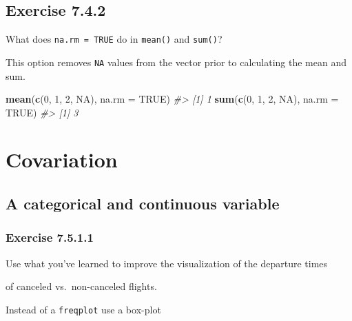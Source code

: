 \documentclass[]{book}
\newenvironment{Shaded}{\begin{snugshade}}{\end{snugshade}}
\newcommand{\CommentTok}[1]{\textcolor[rgb]{0.56,0.35,0.01}{\textit{#1}}}
\newcommand{\DataTypeTok}[1]{\textcolor[rgb]{0.13,0.29,0.53}{#1}}
\newcommand{\DecValTok}[1]{\textcolor[rgb]{0.00,0.00,0.81}{#1}}
\newcommand{\KeywordTok}[1]{\textcolor[rgb]{0.13,0.29,0.53}{\textbf{#1}}}
\newcommand{\NormalTok}[1]{#1}
\newcommand{\OtherTok}[1]{\textcolor[rgb]{0.56,0.35,0.01}{#1}}
\theoremstyle{plain}
\theoremstyle{remark}
\theoremstyle{definition}
\theoremstyle{definition}
\theoremstyle{definition}
\theoremstyle{remark}
\begin{document}
\hypertarget{exercise-7.4.2}{%
\subsection*{\texorpdfstring{Exercise
{7.4.2}}{Exercise 7.4.2}}\label{exercise-7.4.2}}

What does \texttt{na.rm\ =\ TRUE} do in \texttt{mean()} and
\texttt{sum()}?

This option removes \texttt{NA} values from the vector prior to
calculating the mean and sum.

\begin{Shaded}
\begin{Highlighting}[]
\KeywordTok{mean}\NormalTok{(}\KeywordTok{c}\NormalTok{(}\DecValTok{0}\NormalTok{, }\DecValTok{1}\NormalTok{, }\DecValTok{2}\NormalTok{, }\OtherTok{NA}\NormalTok{), }\DataTypeTok{na.rm =} \OtherTok{TRUE}\NormalTok{)}
\CommentTok{#> [1] 1}
\KeywordTok{sum}\NormalTok{(}\KeywordTok{c}\NormalTok{(}\DecValTok{0}\NormalTok{, }\DecValTok{1}\NormalTok{, }\DecValTok{2}\NormalTok{, }\OtherTok{NA}\NormalTok{), }\DataTypeTok{na.rm =} \OtherTok{TRUE}\NormalTok{)}
\CommentTok{#> [1] 3}
\end{Highlighting}
\end{Shaded}

\hypertarget{covariation}{%
\section{Covariation}\label{covariation}}

\hypertarget{a-categorical-and-continuous-variable}{%
\subsection{A categorical and continuous
variable}\label{a-categorical-and-continuous-variable}}

\hypertarget{exercise-7.5.1.1}{%
\subsubsection*{\texorpdfstring{Exercise
{7.5.1.1}}{Exercise 7.5.1.1}}\label{exercise-7.5.1.1}}

Use what you've learned to improve the visualization of the departure
times

of canceled vs.~non-canceled flights.

Instead of a \texttt{freqplot} use a box-plot
\end{document}
